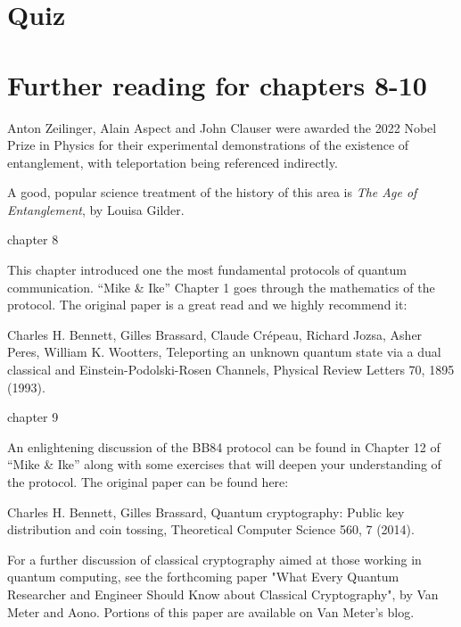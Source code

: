 \newpage
\section*{Quiz}


\section*{Further reading for chapters 8-10}

Anton Zeilinger, Alain Aspect and John Clauser were awarded the 2022 Nobel Prize in Physics for their experimental demonstrations of the existence of entanglement, with teleportation being referenced indirectly.

A good, popular science treatment of the history of this area is \emph{The Age of Entanglement}, by Louisa Gilder.

chapter 8

This chapter introduced one the most fundamental protocols of quantum communication. “Mike \& Ike” Chapter 1 goes through the mathematics of the protocol. The original paper is a great read and we highly recommend it:

Charles H. Bennett, Gilles Brassard, Claude Crépeau, Richard Jozsa, Asher Peres, William K. Wootters, Teleporting an unknown quantum state via a dual classical and Einstein-Podolski-Rosen Channels, Physical Review Letters 70, 1895 (1993).

chapter 9

An enlightening discussion of the BB84 protocol can be found in Chapter 12 of “Mike \& Ike” along with some exercises that will deepen your understanding of the protocol.
The original paper can be found here:

Charles H. Bennett, Gilles Brassard, Quantum cryptography: Public key distribution and coin tossing, Theoretical Computer Science 560, 7 (2014).

For a further discussion of classical cryptography aimed at those working in quantum computing, see the forthcoming paper "What Every Quantum Researcher and Engineer Should Know about Classical Cryptography", by Van Meter and Aono.  Portions of this paper are available on Van Meter's blog.

